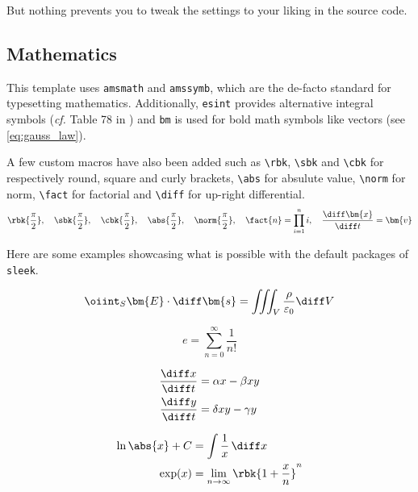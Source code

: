 \documentclass[a4paper, 12pt]{report}
\def\tbs{\textbackslash}
\begin{document}
    But nothing prevents you to tweak the settings to your liking in the source code.

    \subsection{Mathematics}

    This template uses \texttt{amsmath} and \texttt{amssymb}, which are the de-facto standard for typesetting mathematics. Additionally, \texttt{esint} provides alternative integral symbols (\emph{cf.} Table 78 in \cite{pakin2020comprehensive}) and \texttt{bm} is used for bold math symbols like vectors (see \eqref{eq:gauss_law}).

    A few custom macros have also been added such as \texttt{\tbs{}rbk}, \texttt{\tbs{}sbk} and \texttt{\tbs{}cbk} for respectively round, square and curly brackets, \texttt{\tbs{}abs} for absulute value, \texttt{\tbs{}norm} for norm, \texttt{\tbs{}fact} for factorial and \texttt{\tbs{}diff} for up-right differential.
    $$
        \rbk{\frac{\pi}{2}}, \quad \sbk{\frac{\pi}{2}}, \quad \cbk{\frac{\pi}{2}}, \quad \abs{\frac{\pi}{2}}, \quad \norm{\frac{\pi}{2}}, \quad \fact{n} = \prod_{i = 1}^{n} i, \quad \frac{\diff \bm{x}}{\diff t} = \bm{v}
    $$

    Here are some examples showcasing what is possible with the default packages of \texttt{sleek}.

    \begin{equation}\label{eq:gauss_law}
        \oiint_S \bm{E} \cdot \diff \bm{s} = \iiint_V \frac{\rho}{\varepsilon_0} \diff V
    \end{equation}

    \begin{equation*}
        e = \sum_{n=0}^\infty \frac{1}{n!}
    \end{equation*}

    \begin{subequations}
        \begin{align}
            \frac{\diff x}{\diff t} & = \alpha x - \beta xy \\
            \frac{\diff y}{\diff t} & = \delta xy - \gamma y
        \end{align}
    \end{subequations}

    \begin{align*}
        \ln \abs{x} + C & = \int \frac{1}{x} \,\diff x \\
        \exp(x) & = \lim_{n \to \infty} \rbk{1 + \frac{x}{n}}^n
    \end{align*}
\end{document}
